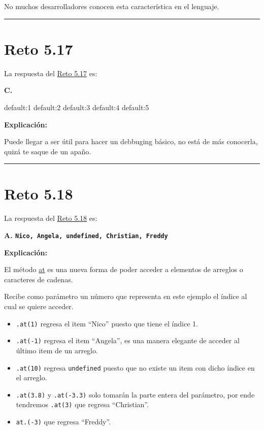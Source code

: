 \documentclass[
  letterpaper,
  DIV=11,
  numbers=noendperiod]{scrreprt}
\newenvironment{Shaded}{\begin{snugshade}}{\end{snugshade}}
\newcommand{\DecValTok}[1]{\textcolor[rgb]{0.68,0.00,0.00}{#1}}
\newcommand{\ImportTok}[1]{\textcolor[rgb]{0.00,0.46,0.62}{#1}}
\newcommand{\OperatorTok}[1]{\textcolor[rgb]{0.37,0.37,0.37}{#1}}
\begin{document}
No muchos desarrolladores conocen esta característica en el lenguaje.

\begin{center}\rule{0.5\linewidth}{0.5pt}\end{center}

\section{Reto 5.17}\label{sec-sol-cap5-reto17}

La respuesta del \hyperref[sec-cap5-reto17]{Reto 5.17} es:

\textbf{C.}

\begin{Shaded}
\begin{Highlighting}[]
\ImportTok{default}\OperatorTok{:}\DecValTok{1}
\ImportTok{default}\OperatorTok{:}\DecValTok{2}
\ImportTok{default}\OperatorTok{:}\DecValTok{3}
\ImportTok{default}\OperatorTok{:}\DecValTok{4}
\ImportTok{default}\OperatorTok{:}\DecValTok{5}
\end{Highlighting}
\end{Shaded}

\textbf{Explicación:}

Puede llegar a ser útil para hacer un debbuging básico, no está de más
conocerla, quizá te saque de un apaño.

\begin{center}\rule{0.5\linewidth}{0.5pt}\end{center}

\section{Reto 5.18}\label{sec-sol-cap5-reto18}

La respuesta del \hyperref[sec-cap5-reto18]{Reto 5.18} es:

\textbf{A. \texttt{Nico,\ Angela,\ undefined,\ Christian,\ Freddy}}

\textbf{Explicación:}

El método \hyperref[glos-at]{at} es una nueva forma de poder acceder a
elementos de arreglos o caracteres de cadenas.

Recibe como parámetro un número que representa en este ejemplo el índice
al cual se quiere acceder.

\begin{itemize}
\item
  \texttt{.at(1)} regresa el item ``Nico'' puesto que tiene el índice 1.
\item
  \texttt{.at(-1)} regresa el item ``Angela'', es una manera elegante de
  acceder al último item de un arreglo.
\item
  \texttt{.at(10)} regresa \texttt{undefined} puesto que no existe un
  item con dicho índice en el arreglo.
\item
  \texttt{.at(3.8)} y \texttt{.at(-3.3)} solo tomarán la parte entera
  del parámetro, por ende tendremos \texttt{.at(3)} que regresa
  ``Christian''.
\item
  \texttt{at.(-3)} que regresa ``Freddy''.
\end{itemize}
\end{document}
